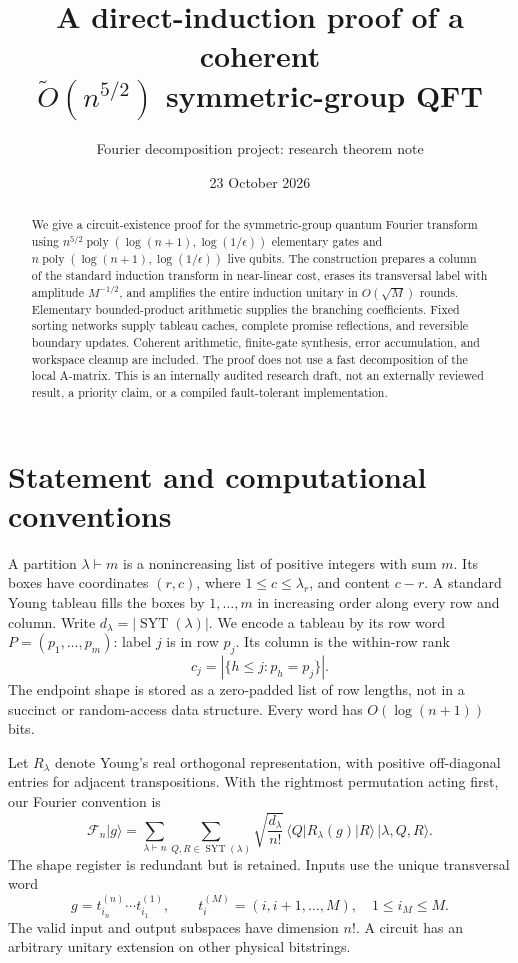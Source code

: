 \documentclass[11pt]{article}
\title{A direct-induction proof of a coherent\texorpdfstring{\\}{ }$\widetilde O(n^{5/2})$ symmetric-group QFT}
\author{Fourier decomposition project: research theorem note}
\date{23 October 2026}
\theoremstyle{definition}
\newcommand{\ket}[1]{\lvert #1\rangle}
\newcommand{\bra}[1]{\langle #1\rvert}
\newcommand{\F}{\mathcal F}
\newcommand{\poly}{\operatorname{poly}}
\newcommand{\SYT}{\operatorname{SYT}}
\begin{document}
\maketitle

\begin{abstract}
We give a circuit-existence proof for the symmetric-group quantum Fourier
transform using $n^{5/2}\poly(\log(n+1),\log(1/\epsilon))$ elementary gates
and $n\poly(\log(n+1),\log(1/\epsilon))$ live qubits. The construction
prepares a column of the standard induction transform in near-linear cost,
erases its transversal label with amplitude $M^{-1/2}$, and amplifies the
entire induction unitary in $O(\sqrt M)$ rounds. Elementary bounded-product
arithmetic supplies the branching coefficients. Fixed sorting networks
supply tableau caches, complete promise reflections, and reversible
boundary updates. Coherent arithmetic, finite-gate synthesis, error
accumulation, and workspace cleanup are included. The proof does not use a
fast decomposition of the local A-matrix. This is an internally audited
research draft, not an externally reviewed result, a priority claim, or a
compiled fault-tolerant implementation.
\end{abstract}

\section{Statement and computational conventions}

A partition $\lambda\vdash m$ is a nonincreasing list of positive integers
with sum $m$. Its boxes have coordinates $(r,c)$, where $1\le c\le\lambda_r$,
and content $c-r$. A standard Young tableau fills the boxes by $1,\ldots,m$
in increasing order along every row and column. Write $d_\lambda=|\SYT(\lambda)|$.
We encode a tableau by its row word $P=(p_1,\ldots,p_m)$: label $j$ is in
row $p_j$. Its column is the within-row rank
\[
 c_j=|\{h\le j:p_h=p_j\}|.
\]
The endpoint shape is stored as a zero-padded list of row lengths, not in a
succinct or random-access data structure. Every word has $O(\log(n+1))$ bits.

Let $R_\lambda$ denote Young's real orthogonal representation, with positive
off-diagonal entries for adjacent transpositions. With the rightmost
permutation acting first, our Fourier convention is
\begin{equation}\label{eq:qft}
 \F_n\ket g=\sum_{\lambda\vdash n}\sum_{Q,R\in\SYT(\lambda)}
 \sqrt{\frac{d_\lambda}{n!}}\,
 \bra Q R_\lambda(g)\ket R\,\ket{\lambda,Q,R}.
\end{equation}
The shape register is redundant but is retained. Inputs use the unique
transversal word
\[
 g=t_{i_n}^{(n)}\cdots t_{i_1}^{(1)},\qquad
 t_i^{(M)}=(i,i+1,\ldots,M),\quad 1\le i_M\le M.
\]
The valid input and output subspaces have dimension $n!$. A circuit has an
arbitrary unitary extension on other physical bitstrings.
\end{document}
